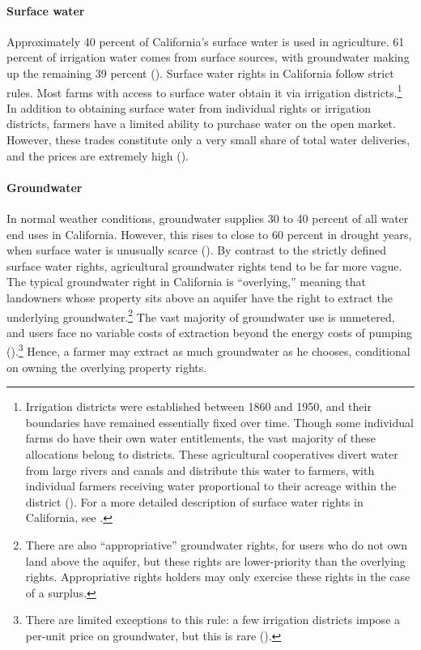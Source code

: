 \paragraph{Surface water}
Approximately 40 percent of California's surface water is used in agriculture. 61 percent of irrigation water comes from surface sources, with groundwater making up the remaining 39 percent (\textcite{cdwr2015}). Surface water rights in California follow strict rules. Most farms with access to surface water obtain it via irrigation districts.\footnote{Irrigation districts were established between 1860 and 1950, and their boundaries have remained essentially fixed over time. Though some individual farms do have their own water entitlements, the vast majority of these allocations belong to districts. These agricultural cooperatives divert water from large rivers and canals and distribute this water to farmers, with individual farmers receiving water proportional to their acreage within the district (\textcite{schlenker2007}). For a more detailed description of surface water rights in California, see \textcite{hagerty2019}.} In addition to obtaining surface water from individual rights or irrigation districts, farmers have a limited ability to purchase water on the open market. However, these trades constitute only a very small share of total water deliveries, and the prices are extremely high (\textcite{hagerty2018}).


\paragraph{Groundwater}
In normal weather conditions, groundwater supplies 30 to 40 percent of all water end uses in California. However, this rises to close to 60 percent in drought years, when surface water is unusually scarce (\textcite{cdwr2014}).
By contrast to the strictly defined surface water rights, agricultural groundwater rights tend to be far more vague. The typical groundwater right in California is ``overlying,'' meaning that landowners whose property sits above an aquifer have the right to extract the underlying groundwater.\footnote{
There are also ``appropriative'' groundwater rights, for users who do not own land above the aquifer, but these rights are lower-priority than the overlying rights. Appropriative rights holders may only exercise these rights in the case of a surplus.}
The vast majority of groundwater use is unmetered, and users face no variable costs of extraction beyond the energy costs of pumping (\textcite{bruno2018}).\footnote{There are limited exceptions to this rule: a few irrigation districts impose a per-unit price on groundwater, but this is rare (\textcite{bruno2018}).} Hence, a farmer may extract as much groundwater as he chooses, conditional on owning the overlying property rights. 

